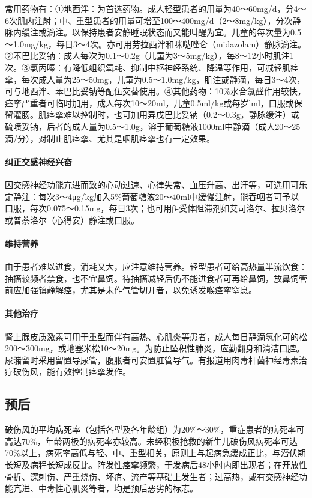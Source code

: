 常用药物有：①地西泮：为首选药物。成人轻型患者的用量为40～60mg/d，分4～6次肌内注射；中、重型患者的用量可增至100～400mg/d（2～8mg/kg），分次静脉内缓注或滴注。以保持患者安静睡眠状态而又能叫醒为宜。儿童的每次量为0.5～1.0mg/kg，每日3～4次。亦可用劳拉西泮和咪哒唑仑（midazolam）静脉滴注。②苯巴比妥钠：成人每次为0.1～0.2g（儿童为3～5mg/kg），每8～12小时肌注1次。③氯丙嗪：有降低组织氧耗、抑制中枢神经系统、降温等作用，可减轻肌痉挛，每次成人量为25～50mg，儿童为0.5～1.0mg/kg，肌注或静滴，每日3～4次，可与地西泮、苯巴比妥钠等配伍交替使用。④其他药物：10\%水合氯醛作用较快，痉挛严重者可临时加用，成人每次10～20ml，儿童0.5ml/kg或每岁lml，口服或保留灌肠。肌痉挛难以控制时，也可加用异戊巴比妥钠（0.2～0.3g，静脉缓注）或硫喷妥钠，后者的成人量为0.5～1.0g，溶于葡萄糖液1000ml中静滴（成人20～25滴/分），对制止肌痉挛、尤其是咽肌痉挛也有一定效果。

\paragraph{纠正交感神经兴奋}

因交感神经功能亢进而致的心动过速、心律失常、血压升高、出汗等，可选用可乐定静注：每次3～4μg/kg加入5\%葡萄糖液20～40ml中缓慢注射，能吞咽者可予以口服，每次0.075～0.15mg，每日3次；也可用β-受体阻滞剂如艾司洛尔、拉贝洛尔或普萘洛尔（心得安）静注或口服。

\paragraph{维持营养}

由于患者难以进食，消耗又大，应注意维持营养。轻型患者可给高热量半流饮食：抽搐较频者禁食，也不宜鼻饲。待抽搐减轻后仍不能进食者可再给鼻饲，放鼻饲管前应加强镇静解痉，尤其是未作气管切开者，以免诱发喉痉挛窒息。

\paragraph{其他治疗}

肾上腺皮质激素可用于重型而伴有高热、心肌炎等患者，成人每日静滴氢化可的松200～300mg，或地塞米松10～20mg。为防止坠积性肺炎，应勤翻身和清洁口腔。尿潴留时采用留置导尿管，腹胀者可安置肛管导气。有报道用肉毒杆菌神经毒素治疗破伤风，能有效控制痉挛发作。

\subsection{预后}

破伤风的平均病死率（包括各型及各年龄组）为20\%～30\%，重症患者的病死率可高达70\%，年龄两极的病死率亦较高。未经积极抢救的新生儿破伤风病死率可达70\%以上，病死率高低与轻、中、重型相关，原则上与起病急缓成正比，与潜伏期长短及病程长短成反比。阵发性痉挛频繁，于发病后48小时内即出现者；在开放性骨折、深刺伤、严重烧伤、坏疽、流产等基础上发生者；过高热，或有交感神经功能亢进、中毒性心肌炎等者，均是预后恶劣的标志。

